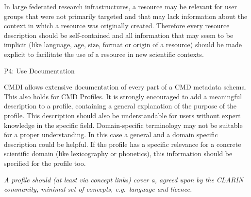 
In large federated research infrastructures, a resource may be relevant for user groups that were not primarily targeted and that may lack information about the context in which a resource was originally created. Therefore every resource description should be self-contained and all information that may seem to be implicit (like language, age, size, format or origin of a resource) should be made explicit to facilitate the use of a resource in new scientific contexts.

P4: Use Documentation

 

CMDI allows extensive documentation of every part of a CMD metadata schema. This also holds for CMD Profiles. It is strongly encouraged to add a meaningful description to a profile, containing a general explanation of the purpose of the profile. This description should also be understandable for users without expert knowledge in the specific field. Domain-specific terminology may not be suitable for a proper
understanding. In this case a general and a domain specific description could be helpful. If the profile has a specific relevance for a concrete scientific domain (like lexicography or phonetics), this information should be specified for the profile too.

\begin{workinprogress}

 

\emph{A profile should (at least via concept links) cover a, agreed upon by the CLARIN community, minimal set of concepts, e.g.~language and licence.}

\end{workinprogress}